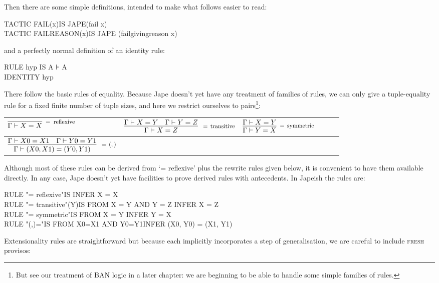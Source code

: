 \documentclass[11pt]{book}
\newcommand{\tab}{\hspace{5mm}}
\newcommand{\reason}[1]{\scalebox{0.85}{#1}}
\begin{document}
Then there are some simple definitions, intended to make what follows easier to read:

TACTIC FAIL(x)\tab IS JAPE(fail x)\\
TACTIC FAILREASON(x)\tab IS JAPE (failgivingreason x)


and a perfectly normal definition of an identity rule:

RULE hyp IS A ⊦ A\\
IDENTITY hyp


There follow the basic rules of equality. Because Jape doesn't yet have any treatment of families of rules, we can only give a tuple-equality rule for a fixed finite number of tuple sizes, and here we restrict ourselves to pairs\footnote{But see our treatment of BAN logic in a later chapter: we are beginning to be able to handle some simple families of rules.}:\\


\begin{tabular}{|p{1.584in}|p{1.603in}|p{1.168in}|p{0.048in}|p{0.048in}|p{0.048in}|}
\hline
{\raggedright 
$\infer[\reason{$=\;\operatorname{reflexive}$}]
       {\Gamma  |- X=X}
       {}$
} & 
{\raggedright 
$\infer[\reason{$
\;=\,\operatorname{transitive}$}]
       {\Gamma  |- X=Z}
       {\Gamma  |- X=Y\quad \Gamma  |- Y=Z}$
} & 
{\raggedright 
$\infer[\reason{$=\,\operatorname{symmetric}$}]
       {\Gamma  |- Y=X}
       {\Gamma  |- X=Y}$
}\\
\hline
{\raggedright 
$\infer[\reason{$
\;=\,(,)$}]
       {\Gamma  |- (X0,X1)=(Y0,Y1)}
       {\Gamma  |- X0=X1\quad \Gamma  |- Y0=Y1}$
} & 
{\raggedright } & 
{\raggedright }\\
\hline
\end{tabular}


Although most of these rules can be derived from `= reflexive' plus the rewrite rules given below, it is convenient to have them available directly. In any case, Jape doesn't yet have facilities to prove derived rules with antecedents. In Japeish the rules are:

RULE "= reflexive"\tab IS \tab INFER X = X\\
RULE "= transitive"(Y)\tab IS FROM X = Y AND Y = Z \tab INFER X = Z\\
RULE "= symmetric"\tab IS FROM X = Y \tab INFER Y = X\\
RULE "(,)="\tab IS FROM X0=X1 AND Y0=Y1\tab INFER (X0, Y0) = (X1, Y1)


Extensionality rules are straightforward but because each implicitly incorporates a step of generalisation, we are careful to include \textsc{fresh} provisos:\\
\end{document}
